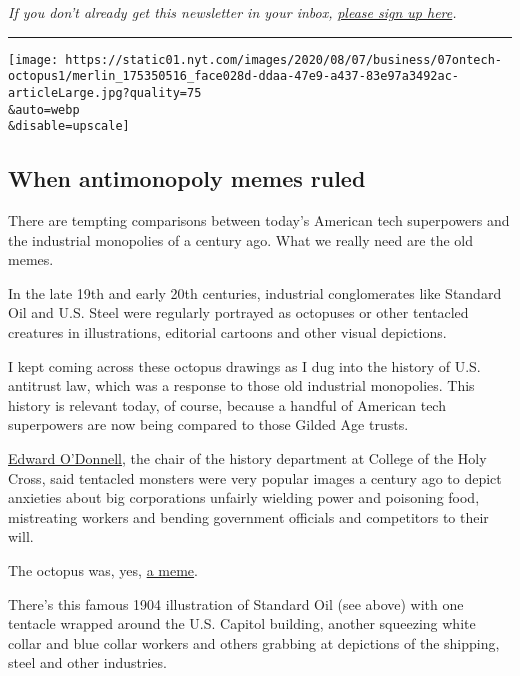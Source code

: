 \emph{If you don't already get this newsletter in your inbox,}
\href{https://www.nytimes.com/newsletters/signup/OT}{\emph{please sign
up here}}\emph{.}

\begin{center}\rule{0.5\linewidth}{\linethickness}\end{center}

\texttt{[image: https://static01.nyt.com/images/2020/08/07/business/07ontech-octopus1/merlin\_175350516\_face028d-ddaa-47e9-a437-83e97a3492ac-articleLarge.jpg?quality=75\\\&auto=webp\\\&disable=upscale]}

\hypertarget{when-antimonopoly-memes-ruled}{%
\subsection{When antimonopoly memes
ruled}\label{when-antimonopoly-memes-ruled}}

There are tempting comparisons between today's American tech superpowers
and the industrial monopolies of a century ago. What we really need are
the old memes.

In the late 19th and early 20th centuries, industrial conglomerates like
Standard Oil and U.S. Steel were regularly portrayed as octopuses or
other tentacled creatures in illustrations, editorial cartoons and other
visual depictions.

I kept coming across these octopus drawings as I dug into the history of
U.S. antitrust law, which was a response to those old industrial
monopolies. This history is relevant today, of course, because a handful
of American tech superpowers are now being compared to those Gilded Age
trusts.

\href{https://www.holycross.edu/academics/programs/history/faculty/edward-t-odonnell}{Edward
O'Donnell}, the chair of the history department at College of the Holy
Cross, said tentacled monsters were very popular images a century ago to
depict anxieties about big corporations unfairly wielding power and
poisoning food, mistreating workers and bending government officials and
competitors to their will.

The octopus was, yes,
\href{https://en.wikipedia.org/wiki/Internet_meme}{a meme}.

There's this famous 1904 illustration of Standard Oil (see above) with
one tentacle wrapped around the U.S. Capitol building, another squeezing
white collar and blue collar workers and others grabbing at depictions
of the shipping, steel and other industries.

